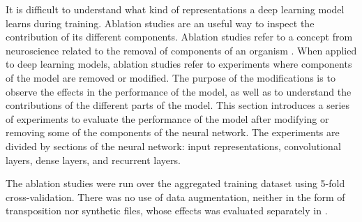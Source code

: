 
It is difficult to understand what kind of representations a
deep learning model learns during training. Ablation studies
are an useful way to inspect the contribution of its
different components. Ablation studies refer to a concept
from neuroscience related to the removal of components of an
organism \parencite{meyes2019ablation}. When applied to deep
learning models, ablation studies refer to experiments where
components of the model are removed or modified. The purpose
of the modifications is to observe the effects in the
performance of the model, as well as to understand the
contributions of the different parts of the model. This
section introduces a series of experiments to evaluate the
performance of the model after modifying or removing some of
the components of the neural network. The experiments are
divided by sections of the neural network: input
representations, convolutional layers, dense layers, and
recurrent layers.

The ablation studies were run over the aggregated training
dataset using 5-fold cross-validation. There was no use of
data augmentation, neither in the form of transposition nor
synthetic files, whose effects was evaluated separately in
.
